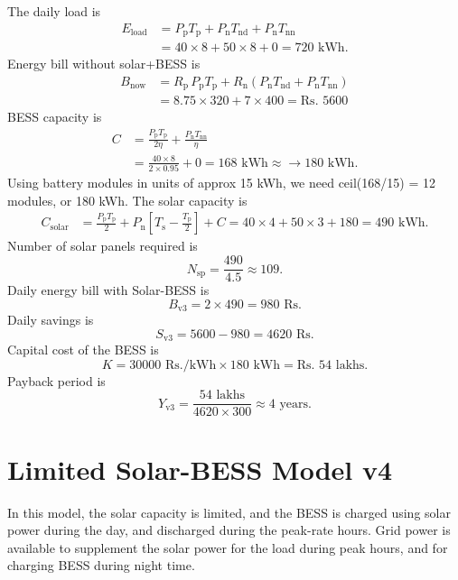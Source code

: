 \documentclass[a4paper]{article}
\begin{document}
The daily load is
\begin{align}
    E_{\text{load}} & = P_{\text{p}} T_{\text{p}} + P_{\text{n}} T_{\text{nd}} + P_\text{n} T_\text{nn} \\
    & = 40 \times 8 + 50 \times 8 + 0 = 720 \text{ kWh}.  
\end{align}
Energy bill without solar+BESS is
\begin{align}
    B_{\text{now}} & = 
    R_\text{p} \, P_{\text{p}} T_{\text{p}} + R_\text{n} ( 
    P_{\text{n}} T_{\text{nd}}+ P_\text{n} T_\text{nn} )   \\
    &= 8.75 \times 320 + 7 \times 400 = \text{Rs. } 5600
\end{align}
BESS capacity is
\begin{align}
    C & = \frac{P_\text{p} T_\text{p} }{2 \eta} + \frac{P_\text{n} T_\text{nn} }{\eta} \\
    & = \frac{40 \times 8}{2 \times 0.95} + 0 = 168 \text{ kWh} \approx\to 180 \text{ kWh}.
\end{align}
Using battery modules in units of approx 15 kWh, we need ceil(168/15) = 12 modules, or 180 kWh.
The solar capacity is
\begin{align}
    C_{\text{solar}} & = 
    \frac{P_{\text{p}} T_{\text{p}} }{2} + P_{\text{n}} \left[T_{\text{s}} - \frac{T_{\text{p}}}{2} \right] + C
    = 40 \times 4 + 50 \times 3 + 180 = 490 \text{ kWh}.
\end{align}
Number of solar panels required is
\begin{equation}
    N_{\text{sp}} = \frac{490}{4.5} \approx 109.
\end{equation}
Daily energy bill with Solar-BESS is
\begin{equation}
    B_{\text{v3}} = 2 \times 490 = 980 \text{ Rs.}
\end{equation}
Daily savings is
\begin{equation}
    S_{\text{v3}} = 5600 - 980 = 4620 \text{ Rs.}
\end{equation}
Capital cost of the BESS is
\begin{equation}
    K = 30000 \text{ Rs./kWh} \times 180 \text{ kWh} = \text{Rs. }54 \text{ lakhs}.
\end{equation}
Payback period is
\begin{equation}
    Y_{\text{v3}} = \frac{54 \text{ lakhs}}{4620 \times 300} \approx 4 \text{ years}.
\end{equation}

\section{Limited Solar-BESS Model v4}
In this model, the solar capacity is limited, and the BESS is charged
using solar power during the day, and discharged during the peak-rate hours.
Grid power is available to supplement the solar power for the load during 
peak hours, and for charging BESS during night time.
\end{document}
